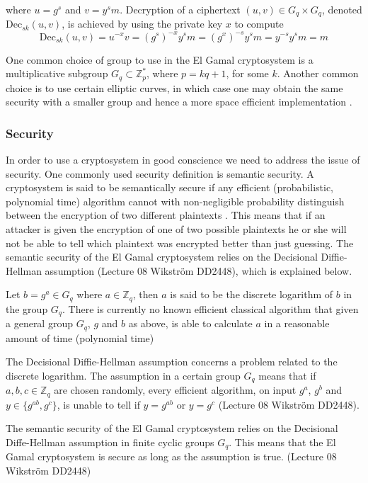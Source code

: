  where $u = g^s$ and $v = y^sm$. Decryption of a ciphertext $(u,v) \in
 G_q \times G_q$, denoted $\mathrm{Dec}_{sk}(u,v)$, is achieved by
 using the private key $x$ to compute
$$
\mathrm{Dec}_{sk}(u,v) = u^{-x}v =
(g^s)^{-x}y^sm = (g^x)^{-s}y^sm = y^{-s}y^sm = m
$$

One common choice of group to use in the El Gamal cryptosystem is a
multiplicative subgroup $G_q \subset \mathbb{Z}_p^*$, where $p = kq +
1$, for some $k$. Another common choice is to use certain elliptic
curves, in which case one may obtain the same security with a smaller
group and hence a more space efficient implementation
\cite[p.~297]{hac}.

\subsubsection{Security}
In order to use a cryptosystem in good conscience we need to address
the issue of security. One commonly used security definition is
semantic security. A cryptosystem is said to be semantically secure if
any efficient (probabilistic, polynomial time) algorithm cannot with
non-negligible probability distinguish between the encryption of two
different plaintexts \cite[p.~306]{hac}. This means that if an
attacker is given the encryption of one of two possible plaintexts he
or she will not be able to tell which plaintext was encrypted better
than just guessing. The semantic security of the El Gamal cryptosystem
relies on the Decisional Diffie-Hellman assumption (Lecture 08
Wikström DD2448), which is explained below.

Let $b = g^a \in G_q$ where $a \in \mathbb{Z}_q$, then $a$ is said to
be the discrete logarithm of $b$ in the group $G_q$. There is
currently no known efficient classical algorithm that given a general
group $G_q$, $g$ and $b$ as above, is able to calculate $a$ in a
reasonable amount of time (polynomial time) \cite[p.~103]{hac}

The Decisional Diffie-Hellman assumption concerns a problem related to
the discrete logarithm. The assumption in a certain group $G_q$ means
that if $a,b,c \in \mathbb{Z}_q$ are chosen randomly, every efficient
algorithm, on input $g^a$, $g^b$ and $y \in \{g^{ab}, g^c\}$, is
unable to tell if $y = g^{ab}$ or $y = g^c$ (Lecture 08 Wikström
DD2448).

The semantic security of the El Gamal cryptosystem relies on the
Decisional Diffe-Hellman assumption in finite cyclic groups
$G_q$. This means that the El Gamal cryptosystem is secure as long as
the assumption is true. (Lecture 08 Wikström DD2448)


